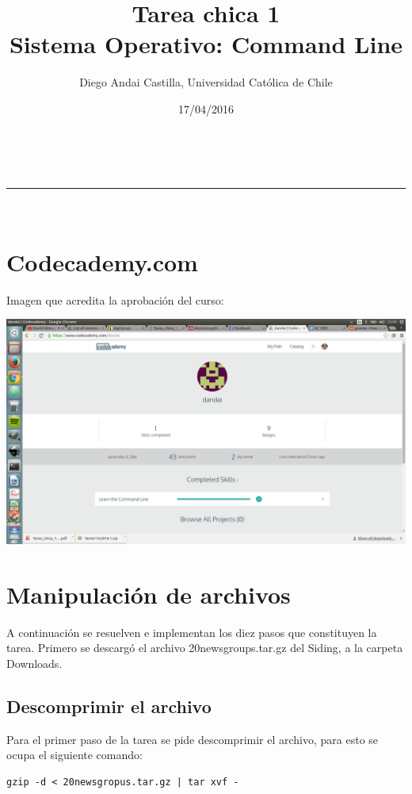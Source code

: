 \documentclass[a4paper,11pt]{article}
\makeatletter
\newcommand{\linia}{\rule{\linewidth}{0.5pt}}
\theoremstyle{mytheor}
\renewcommand{\maketitle}{
\begin{center}
\vspace{2ex}
{\huge \textsc{\@title}}
\vspace{1ex}
\\
\linia\\
\@author \hfill \@date
\vspace{4ex}
\end{center}
}
\makeatother
\begin{document}
\title{Tarea chica 1\\Sistema Operativo: Command Line}

\author{Diego Andai Castilla, Universidad Católica de Chile}

\date{17/04/2016}

\maketitle

\section{Codecademy.com}

Imagen que acredita la aprobaci\'on del curso:

\begin{center}
\includegraphics[scale=0.25]{codecademytc1.png}
\end{center}

\section{Manipulación de archivos}

A continuación se resuelven e implementan los diez pasos que constituyen la tarea. Primero se descargó el archivo 20newsgroups.tar.gz del Siding, a la carpeta Downloads.

\subsection{Descomprimir el archivo}

Para el primer paso de la tarea se pide descomprimir el archivo, para esto se ocupa el siguiente comando:

\begin{lstlisting}
gzip -d < 20newsgropus.tar.gz | tar xvf -
\end{lstlisting}
\end{document}
